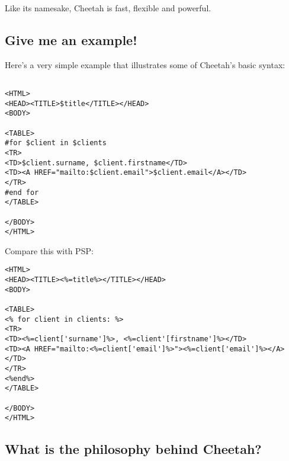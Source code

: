 Like its namesake, Cheetah is fast, flexible and powerful.

\subsection{Give me an example!}
\label{intro.whatIs}

Here's a very simple example that illustrates some of Cheetah's basic syntax:

\begin{verbatim}

<HTML>
<HEAD><TITLE>$title</TITLE></HEAD>
<BODY>

<TABLE>
#for $client in $clients
<TR>
<TD>$client.surname, $client.firstname</TD>
<TD><A HREF="mailto:$client.email">$client.email</A></TD>
</TR>
#end for
</TABLE>

</BODY>
</HTML>
\end{verbatim}

Compare this with PSP:

\begin{verbatim}
<HTML>
<HEAD><TITLE><%=title%></TITLE></HEAD>
<BODY>

<TABLE>
<% for client in clients: %>
<TR>
<TD><%=client['surname']%>, <%=client'[firstname']%></TD>
<TD><A HREF="mailto:<%=client['email']%>"><%=client['email']%></A></TD>
</TR>
<%end%>
</TABLE>

</BODY>
</HTML>
\end{verbatim}



\subsection{What is the philosophy behind Cheetah?}
\label{intro.philosophy}

